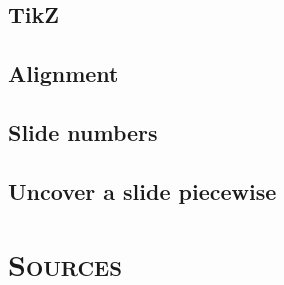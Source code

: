 \documentclass[10pt,xcolor=x11names,compress,fleqn]{beamer}
\begin{document}
  \subsection{TikZ}
  
  
  \subsection{Alignment}
  
  
  \subsection{Slide numbers}   
  
  
  \subsection{Uncover a slide piecewise}
  
  
  \section{\scshape Sources}   
  
		
\end{document}
